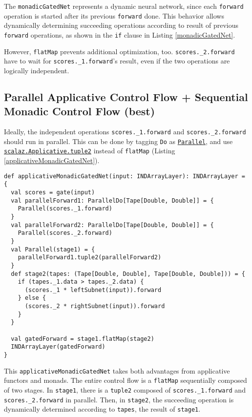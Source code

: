The \lstinline{monadicGatedNet} represents a dynamic neural network, since each \lstinline{forward} operation is started after its previous \lstinline{forward} done. This behavior allows dynamically determining succeeding operations according to result of previous \lstinline{forward} operations, as shown in the \lstinline{if} clause in Listing \ref{monadicGatedNet}.

However, \lstinline{flatMap} prevents additional optimization, too.
\lstinline{scores._2.forward} have to wait for \lstinline{scores._1.forward}'s result, even if the two operations are logically independent.

\subsection{Parallel Applicative Control Flow + Sequential Monadic Control Flow (best)\label{applicative}}

Ideally, the independent operations \lstinline{scores._1.forward} and \lstinline{scores._2.forward} should run in parallel. This can be done by tagging \lstinline{Do} as \href{https://javadoc.io/page/org.scalaz/scalaz_2.11/latest/scalaz/Tags%24%24Parallel.html}{\lstinline{Parallel}}, and use \href{https://javadoc.io/page/org.scalaz/scalaz_2.11/latest/scalaz/Applicative.html#tuple2[A,B](fa:=>F[A],fb:=>F[B]):F[(A,B)]}{\lstinline{scalaz.Applicative.tuple2}} instead of \lstinline{flatMap} (Listing \ref{applicativeMonadicGatedNet}).

\begin{lstlisting}[float={htbp},caption={Applicative + monadic gated network}, label={applicativeMonadicGatedNet}]
def applicativeMonadicGatedNet(input: INDArrayLayer): INDArrayLayer = {
  val scores = gate(input)
  val parallelForward1: ParallelDo[Tape[Double, Double]] = {
    Parallel(scores._1.forward)
  }
  val parallelForward2: ParallelDo[Tape[Double, Double]] = {
    Parallel(scores._2.forward)
  }
  val Parallel(stage1) = {
  	parallelForward1.tuple2(parallelForward2)
  }
  def stage2(tapes: (Tape[Double, Double], Tape[Double, Double])) = {
    if (tapes._1.data > tapes._2.data) {
      (scores._1 * leftSubnet(input)).forward
    } else {
      (scores._2 * rightSubnet(input)).forward
    }
  }

  val gatedForward = stage1.flatMap(stage2)
  INDArrayLayer(gatedForward)
}
\end{lstlisting}

This \lstinline{applicativeMonadicGatedNet} takes both advantages from applicative functors and monads. The entire control flow is a \lstinline{flatMap} sequentially composed of two stages. In \lstinline{stage1}, there is a \lstinline{tuple2} composed of \lstinline{scores._1.forward} and \lstinline{scores._2.forward} in parallel. Then, in \lstinline{stage2}, the succeeding operation is dynamically determined according to \lstinline{tapes}, the result of \lstinline{stage1}.

